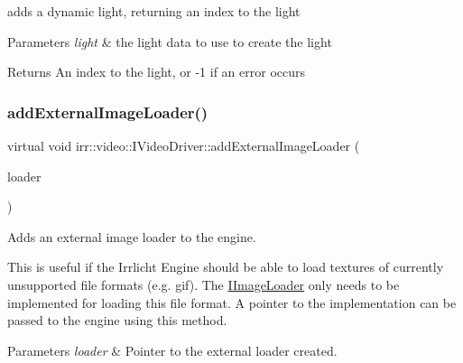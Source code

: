 adds a dynamic light, returning an index to the light 


\begin{DoxyParams}{Parameters}
{\em light} & the light data to use to create the light \\
\hline
\end{DoxyParams}
\begin{DoxyReturn}{Returns}
An index to the light, or -\/1 if an error occurs 
\end{DoxyReturn}
\mbox{\label{classirr_1_1video_1_1IVideoDriver_a9479ae15f0e26eaaf15c9420ff289b6d}} 
\subsubsection{\texorpdfstring{add\+External\+Image\+Loader()}{addExternalImageLoader()}\hspace{0.1cm}{\footnotesize\ttfamily [1/2]}}
{\footnotesize\ttfamily virtual void irr\+::video\+::\+I\+Video\+Driver\+::add\+External\+Image\+Loader (\begin{DoxyParamCaption}\item[{\hyperlink{classirr_1_1video_1_1IImageLoader}{I\+Image\+Loader} $\ast$}]{loader }\end{DoxyParamCaption})\hspace{0.3cm}{\ttfamily [pure virtual]}}



Adds an external image loader to the engine. 

This is useful if the Irrlicht Engine should be able to load textures of currently unsupported file formats (e.\+g. gif). The \hyperlink{classirr_1_1video_1_1IImageLoader}{I\+Image\+Loader} only needs to be implemented for loading this file format. A pointer to the implementation can be passed to the engine using this method. 
\begin{DoxyParams}{Parameters}
{\em loader} & Pointer to the external loader created. \\
\hline
\end{DoxyParams}
\mbox{\label{classirr_1_1video_1_1IVideoDriver_a9479ae15f0e26eaaf15c9420ff289b6d}} 
